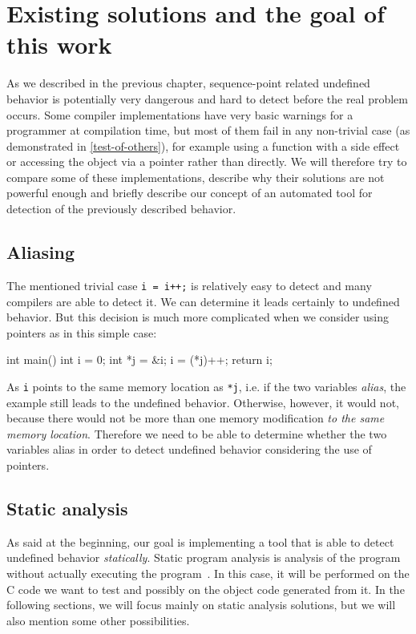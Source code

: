 \chapter{Existing solutions and the goal of this work}
As we described in the previous chapter, sequence-point related undefined behavior is potentially very dangerous and hard to detect before the real problem occurs. Some compiler implementations have very basic warnings for a programmer at compilation time, but most of them fail in any non-trivial case (as demonstrated in \ref{test-of-others}), for example using a function with a side effect or accessing the object via a pointer rather than directly. We will therefore try to compare some of these implementations, describe why their solutions are not powerful enough and briefly describe our concept of an automated tool for detection of the previously described behavior.

\section{Aliasing}
The mentioned trivial case \verb|i = i++;| is relatively easy to detect and many compilers are able to detect it.
We can determine it leads certainly to undefined behavior. But this decision is much more complicated when we consider using pointers as in this simple case:
\\\begin{code}
int main(){
	int i = 0;
	int *j = &i;
	i = (*j)++;
    return i;
}
\end{code}

As \verb|i| points to the same memory location as \verb|*j|, i.e. if the two variables \emph{alias}, the example still leads to the undefined behavior. Otherwise, however, it would not, because there would not be more than one memory modification \emph{to the same memory location}. Therefore we need to be able to determine whether the two variables alias in order to detect undefined behavior considering the use of pointers.

\section{Static analysis}
As said at the beginning, our goal is implementing a tool that is able to detect undefined behavior \emph{statically}. Static program analysis is analysis of the program without actually executing the program~\cite{static-analysis}. In this case, it will be performed on the C code we want to test and possibly on the object code generated from it. In the following sections, we will focus mainly on static analysis solutions, but we will also mention some other possibilities.

